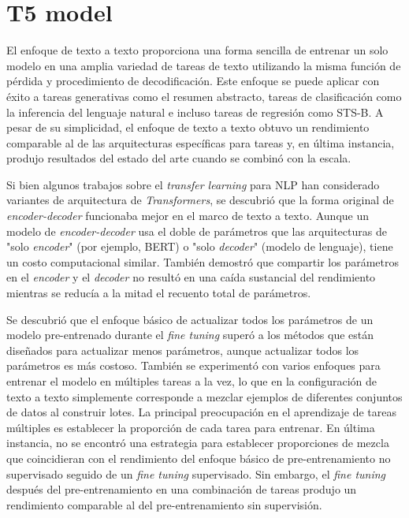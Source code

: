\section{T5 model}
El enfoque de texto a texto proporciona una forma sencilla de entrenar un solo modelo en una amplia variedad de tareas de texto utilizando la misma función de pérdida y procedimiento de decodificación. Este enfoque se puede aplicar con éxito a tareas generativas como el resumen abstracto, tareas de clasificación como la inferencia del lenguaje natural e incluso tareas de regresión como STS-B. A pesar de su simplicidad, el enfoque de texto a texto obtuvo un rendimiento comparable al de las arquitecturas específicas para tareas y, en última instancia, produjo resultados del estado del arte cuando se combinó con la escala.

Si bien algunos trabajos sobre el \textit{transfer learning} para NLP han considerado variantes de arquitectura de \textit{Transformers}, se descubrió que la forma original de \textit{encoder-decoder} funcionaba mejor en el marco de texto a texto. Aunque un modelo de \textit{encoder-decoder} usa el doble de parámetros que las arquitecturas de "solo \textit{encoder}" (por ejemplo, BERT) o "solo \textit{decoder}" (modelo de lenguaje), tiene un costo computacional similar. También demostró que compartir los parámetros en el \textit{encoder} y el \textit{decoder} no resultó en una caída sustancial del rendimiento mientras se reducía a la mitad el recuento total de parámetros.

Se descubrió que el enfoque básico de actualizar todos los parámetros de un modelo pre-entrenado durante el \textit{fine tuning} superó a los métodos que están diseñados para actualizar menos parámetros, aunque actualizar todos los parámetros es más costoso. También se experimentó con varios enfoques para entrenar el modelo en múltiples tareas a la vez, lo que en la configuración de texto a texto simplemente corresponde a mezclar ejemplos de diferentes conjuntos de datos al construir lotes. La principal preocupación en el aprendizaje de tareas múltiples es establecer la proporción de cada tarea para entrenar. En última instancia, no se encontró una estrategia para establecer proporciones de mezcla que coincidieran con el rendimiento del enfoque básico de pre-entrenamiento no supervisado seguido de un \textit{fine tuning} supervisado. Sin embargo, el \textit{fine tuning} después del pre-entrenamiento en una combinación de tareas produjo un rendimiento comparable al del pre-entrenamiento sin supervisión.

